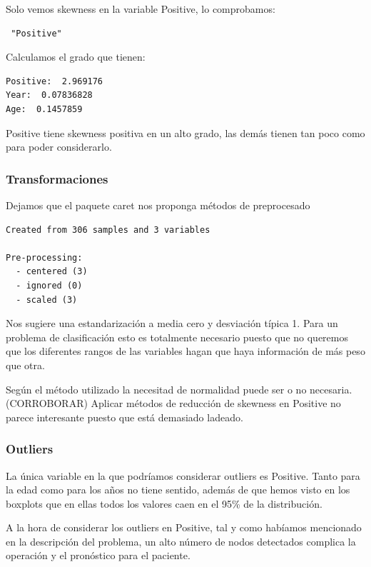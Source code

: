 Solo vemos skewness en la variable Positive, lo comprobamos:

\begin{verbatim}
 "Positive"
\end{verbatim}

Calculamos el grado que tienen:

\begin{verbatim}
Positive:  2.969176
Year:  0.07836828
Age:  0.1457859
\end{verbatim}

Positive tiene skewness positiva en un alto grado, las demás tienen tan poco como para poder considerarlo.

\subsubsection{Transformaciones}

Dejamos que el paquete caret nos proponga métodos de preprocesado

\begin{verbatim}
Created from 306 samples and 3 variables

Pre-processing:
  - centered (3)
  - ignored (0)
  - scaled (3)
\end{verbatim}

Nos sugiere una estandarización a media cero y desviación típica 1. Para un problema de clasificación esto es totalmente necesario puesto que no queremos que los diferentes rangos de las variables hagan que haya información de más peso que otra.

Según el método utilizado la necesitad de normalidad puede ser o no necesaria. (CORROBORAR) Aplicar métodos de reducción de skewness en Positive no parece interesante puesto que está demasiado ladeado.

\subsubsection{Outliers}

La única variable en la que podríamos considerar outliers es Positive. Tanto para la edad como para los años no tiene sentido, además de que hemos visto en los boxplots que en ellas todos los valores caen en el 95\% de la distribución.

A la hora de considerar los outliers en Positive, tal y como habíamos mencionado en la descripción del problema, un alto número de nodos detectados complica la operación y el pronóstico para el paciente.

